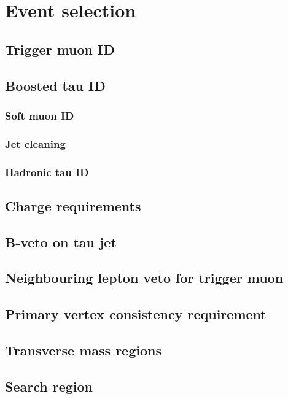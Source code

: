\chapter{Event selection\label{sec:evtsel}}

\section{Trigger muon ID\label{sec:evtsel-triggermu}}

\section{Boosted tau ID\label{sec:evtsel-ditau}}

\subsection{Soft muon ID\label{sec:evtsel-softmu}}

\subsection{Jet cleaning\label{sec:evtsel-jetcleaning}}

\subsection{Hadronic tau ID\label{sec:evtsel-tauID}}

\section{Charge requirements\label{sec:evtsel-charge}}

\section{B-veto on tau jet\label{sec:evtsel-bveto}}

\section{Neighbouring lepton veto for trigger muon\label{sec:evtsel-leptonveto}}

\section{Primary vertex consistency requirement\label{sec:evtsel-vtx}}

\section{Transverse mass regions \label{sec:evtsel-mt}}

\section{Search region \label{sec:evtsel-search}}